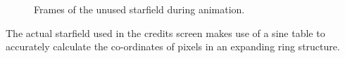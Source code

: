 \begin{figure}[H]
    \centering
    \begin{adjustbox}{width=12cm,center}
      \hspace{0.5cm}
    \end{adjustbox}
  \caption{Frames of the unused starfield during animation.}
\end{figure}

The actual starfield used in the credits screen makes use of a sine table to accurately calculate the co-ordinates
of pixels in an expanding ring structure.

